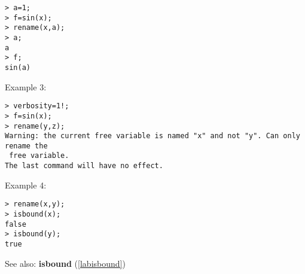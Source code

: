 \begin{center}\begin{minipage}{15cm}\begin{Verbatim}[frame=single]
> a=1;
> f=sin(x);
> rename(x,a);
> a;
a
> f;
sin(a)
\end{Verbatim}
\end{minipage}\end{center}
\noindent Example 3: 
\begin{center}\begin{minipage}{15cm}\begin{Verbatim}[frame=single]
> verbosity=1!;
> f=sin(x);
> rename(y,z);
Warning: the current free variable is named "x" and not "y". Can only rename the
 free variable.
The last command will have no effect.
\end{Verbatim}
\end{minipage}\end{center}
\noindent Example 4: 
\begin{center}\begin{minipage}{15cm}\begin{Verbatim}[frame=single]
> rename(x,y);
> isbound(x);
false
> isbound(y);
true
\end{Verbatim}
\end{minipage}\end{center}
See also: \textbf{isbound} (\ref{labisbound})
